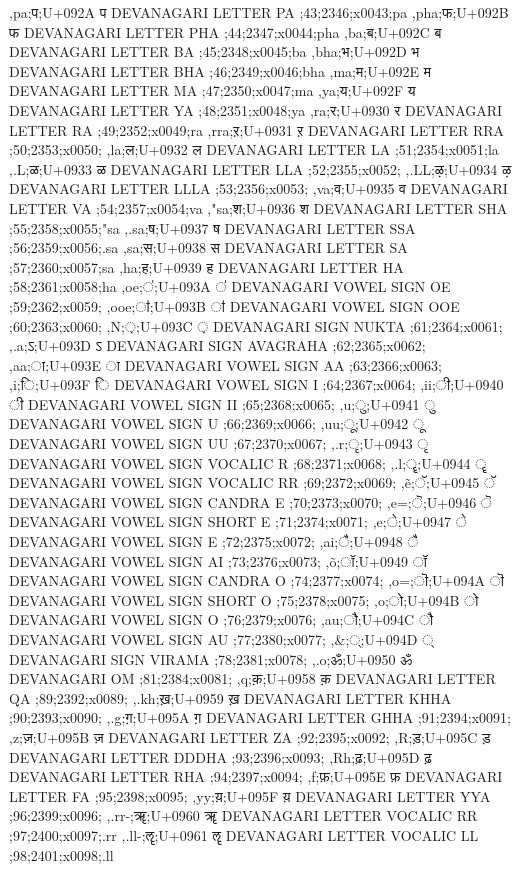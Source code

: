 \documentclass{article}
\begin{document}
{,pa;प;U+092A प DEVANAGARI LETTER PA ;43;2346;x0043;pa
,pha;फ;U+092B फ DEVANAGARI LETTER PHA ;44;2347;x0044;pha
,ba;ब;U+092C ब DEVANAGARI LETTER BA ;45;2348;x0045;ba
,bha;भ;U+092D भ DEVANAGARI LETTER BHA ;46;2349;x0046;bha
,ma;म;U+092E म DEVANAGARI LETTER MA ;47;2350;x0047;ma
,ya;य;U+092F य DEVANAGARI LETTER YA ;48;2351;x0048;ya
,ra;र;U+0930 र DEVANAGARI LETTER RA ;49;2352;x0049;ra
,rra;ऱ;U+0931 ऱ DEVANAGARI LETTER RRA ;50;2353;x0050;
,la;ल;U+0932 ल DEVANAGARI LETTER LA ;51;2354;x0051;la
,.L;ळ;U+0933 ळ DEVANAGARI LETTER LLA ;52;2355;x0052;
,.LL;ऴ;U+0934 ऴ DEVANAGARI LETTER LLLA ;53;2356;x0053;
,va;व;U+0935 व DEVANAGARI LETTER VA ;54;2357;x0054;va
,"sa;श;U+0936 श DEVANAGARI LETTER SHA ;55;2358;x0055;"sa
,.sa;ष;U+0937 ष DEVANAGARI LETTER SSA ;56;2359;x0056;.sa
,sa;स;U+0938 स DEVANAGARI LETTER SA ;57;2360;x0057;sa
,ha;ह;U+0939 ह DEVANAGARI LETTER HA ;58;2361;x0058;ha
,oe;ऺ;U+093A ऺ DEVANAGARI VOWEL SIGN OE ;59;2362;x0059;
,ooe;ऻ;U+093B ऻ DEVANAGARI VOWEL SIGN OOE ;60;2363;x0060;
,N;़;U+093C ़ DEVANAGARI SIGN NUKTA ;61;2364;x0061;
,.a;ऽ;U+093D ऽ DEVANAGARI SIGN AVAGRAHA ;62;2365;x0062;
,aa;ा;U+093E ा DEVANAGARI VOWEL SIGN AA ;63;2366;x0063;
,i;ि;U+093F ि DEVANAGARI VOWEL SIGN I ;64;2367;x0064;
,ii;ी;U+0940 ी DEVANAGARI VOWEL SIGN II ;65;2368;x0065;
,u;ु;U+0941 ु DEVANAGARI VOWEL SIGN U ;66;2369;x0066;
,uu;ू;U+0942 ू DEVANAGARI VOWEL SIGN UU ;67;2370;x0067;
,.r;ृ;U+0943 ृ DEVANAGARI VOWEL SIGN VOCALIC R ;68;2371;x0068;
,.l;ॄ;U+0944 ॄ DEVANAGARI VOWEL SIGN VOCALIC RR ;69;2372;x0069;
,\~e;ॅ;U+0945 ॅ DEVANAGARI VOWEL SIGN CANDRA E ;70;2373;x0070;
,e=;ॆ;U+0946 ॆ DEVANAGARI VOWEL SIGN SHORT E ;71;2374;x0071;
,e;े;U+0947 े DEVANAGARI VOWEL SIGN E ;72;2375;x0072;
,ai;ै;U+0948 ै DEVANAGARI VOWEL SIGN AI ;73;2376;x0073;
,\~o;ॉ;U+0949 ॉ DEVANAGARI VOWEL SIGN CANDRA O ;74;2377;x0074;
,o=;ॊ;U+094A ॊ DEVANAGARI VOWEL SIGN SHORT O ;75;2378;x0075;
,o;ो;U+094B ो DEVANAGARI VOWEL SIGN O ;76;2379;x0076;
,au;ौ;U+094C ौ DEVANAGARI VOWEL SIGN AU ;77;2380;x0077;
,\&;्;U+094D ् DEVANAGARI SIGN VIRAMA ;78;2381;x0078;
%  
%  
,.o;ॐ;U+0950 ॐ DEVANAGARI OM ;81;2384;x0081;
%  
%  
%  
%  
%  
%  
%  
,q;क़;U+0958 क़ DEVANAGARI LETTER QA ;89;2392;x0089;
,.kh;ख़;U+0959 ख़ DEVANAGARI LETTER KHHA ;90;2393;x0090;
,.g;ग़;U+095A ग़ DEVANAGARI LETTER GHHA ;91;2394;x0091;
,z;ज़;U+095B ज़ DEVANAGARI LETTER ZA ;92;2395;x0092;
,R;ड़;U+095C ड़ DEVANAGARI LETTER DDDHA ;93;2396;x0093;
,Rh;ढ़;U+095D ढ़ DEVANAGARI LETTER RHA ;94;2397;x0094;
,f;फ़;U+095E फ़ DEVANAGARI LETTER FA ;95;2398;x0095;
,yy;य़;U+095F य़ DEVANAGARI LETTER YYA ;96;2399;x0096;
,.rr-;ॠ;U+0960 ॠ DEVANAGARI LETTER VOCALIC RR ;97;2400;x0097;.rr
,.ll-;ॡ;U+0961 ॡ DEVANAGARI LETTER VOCALIC LL ;98;2401;x0098;.ll
}
\end{document}
